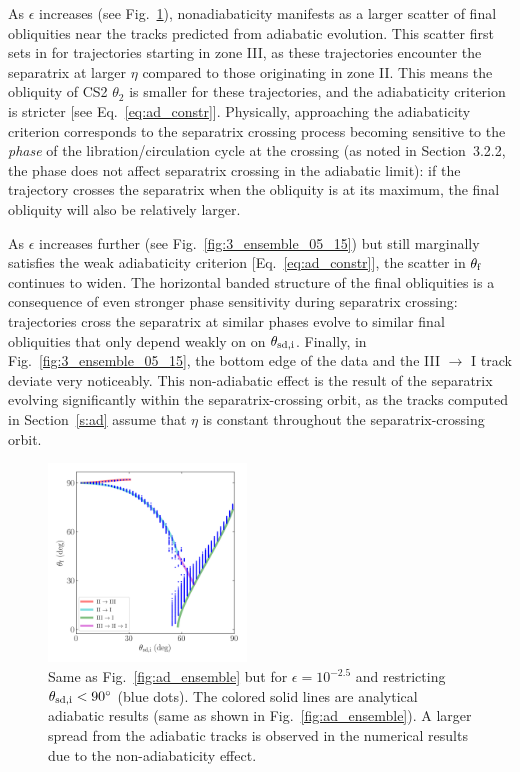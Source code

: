 \documentclass[twocolumn,twocolappendix]{aastex63}
\begin{document}
As $\epsilon$ increases (see Fig.~\ref{fig:3_ensemble_05_25}), nonadiabaticity
manifests as a larger scatter of final obliquities near the tracks predicted
from adiabatic evolution. This scatter first sets in for trajectories starting
in zone III, as these trajectories encounter the separatrix at larger $\eta$
compared to those originating in zone II\@. This means the obliquity of CS2
$\theta_2$ is smaller for these trajectories, and the adiabaticity criterion is
stricter [see Eq.~\eqref{eq:ad_constr}]. Physically, approaching the
adiabaticity criterion corresponds to the separatrix crossing process becoming
sensitive to the \emph{phase} of the libration/circulation cycle at the
crossing \textcolor{Corr}{(as noted in Section~3.2.2, the phase does not affect
separatrix crossing in the adiabatic limit)}: if the trajectory crosses the
separatrix when the obliquity is at its maximum, the final obliquity will also
be relatively larger.

As $\epsilon$ increases further (see Fig.~\ref{fig:3_ensemble_05_15}) but still
marginally satisfies the weak adiabaticity criterion [Eq.~\eqref{eq:ad_constr}],
the scatter in $\theta_{\rm f}$ continues to widen. The horizontal banded
structure of the final obliquities is a consequence of even stronger phase
sensitivity during separatrix crossing: trajectories cross the separatrix at
similar phases evolve to similar final obliquities that only depend weakly on
on $\theta_{\rm sd, i}$. \textcolor{Corr}{Finally, in
Fig.~\ref{fig:3_ensemble_05_15}, the bottom edge of the data and the III $\to$ I
track deviate very noticeably. This non-adiabatic effect is the result of the
separatrix evolving significantly within the separatrix-crossing orbit, as the
tracks computed in Section~\ref{s:ad} assume that $\eta$ is constant throughout
the separatrix-crossing orbit.}

\begin{figure}
    \centering
    \includegraphics[width=0.47\textwidth]{plots_diskdisp/3_ensemble_05_25.png}
    \caption{Same as Fig.~\ref{fig:ad_ensemble} but for $\epsilon = 10^{-2.5}$
    and restricting $\theta_{\rm sd, i} < 90^\circ$ (blue dots). The colored
    solid lines are analytical adiabatic results (same as shown in
    Fig.~\ref{fig:ad_ensemble}). A larger spread from the adiabatic tracks is
    observed in the numerical results due to the non-adiabaticity effect.
    }\label{fig:3_ensemble_05_25}
\end{figure}
\end{document}

